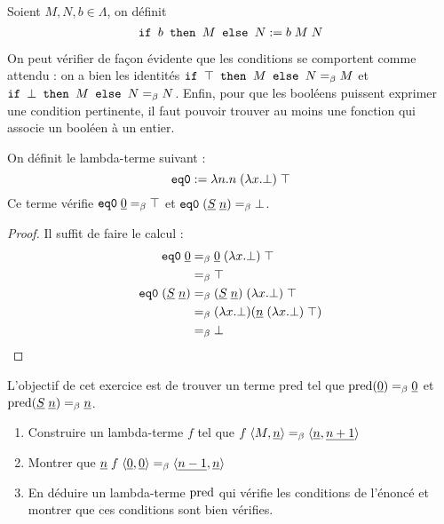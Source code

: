 \begin{defi}[Condition]
    Soient $M,N,b\in\Lambda$, on définit $$\texttt{if } b \texttt{ then } M\texttt{ else }N := b\;M\;N$$
\end{defi}

On peut vérifier de façon évidente que les conditions se comportent comme attendu : on a bien les identités $\texttt{if } \top \texttt{ then } M\texttt{ else }N =_\beta M$ et $\texttt{if } \bot \texttt{ then } M\texttt{ else }N =_\beta N$. Enfin, pour que les booléens puissent exprimer une condition pertinente, il faut pouvoir trouver au moins une fonction qui associe un booléen à un entier.

\begin{defi}[\'Egalité à $0$]
    On définit le lambda-terme suivant : $$\texttt{eq0} := \lambda n. n\;(\lambda x.\bot)\;\top$$ Ce terme vérifie $\texttt{eq0}\;\underline 0 =_\beta \top$ et $\texttt{eq0}\;(\underline S\;\underline n) =_\beta \bot$.
\end{defi}

\begin{proof}
    Il suffit de faire le calcul :
    \begin{align*}
        \texttt{eq0}\;\underline 0 &=_\beta \underline 0 \;(\lambda x.\bot)\;\top\\
        &=_\beta \top\\
        \texttt{eq0}\;(\underline S\;\underline n) &=_\beta (\underline S\;\underline n)\;(\lambda x.\bot)\;\top\\
        &=_\beta (\lambda x.\bot)(\underline n\;(\lambda x.\bot)\;\top)\\
        &=_\beta \bot
    \end{align*}
\end{proof}

\begin{exo}
    L'objectif de cet exercice est de trouver un terme $\mathrm{pred}$ tel que $\mathrm{pred}(\underline 0)=_\beta \underline 0$ et $\mathrm{pred}(\underline S\;\underline n) =_\beta \underline n$.
    \begin{enumerate}
        \item Construire un lambda-terme $f$ tel que $f\;\langle M,\underline n\rangle =_\beta \langle \underline n,\underline{n+1}\rangle$
        \item Montrer que $\underline n \;f\;\langle \underline 0,\underline 0\rangle =_\beta \langle \underline{n-1},\underline{n}\rangle$
        \item En déduire un lambda-terme $\mathrm{pred}$ qui vérifie les conditions de l'énoncé et montrer que ces conditions sont bien vérifies.
    \end{enumerate}
\end{exo}

